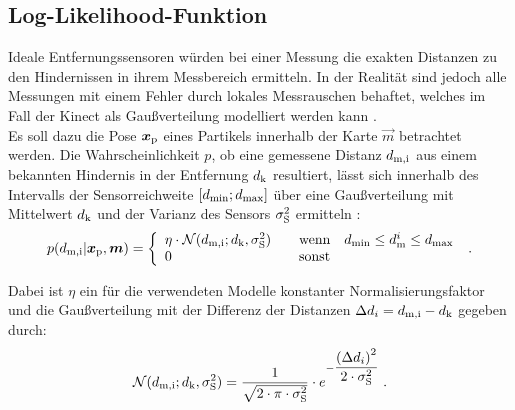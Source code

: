 \subsection{Log-Likelihood-Funktion}
\label{chap.loglik}
Ideale Entfernungssensoren würden bei einer Messung die exakten Distanzen zu den Hindernissen in ihrem Messbereich ermitteln. In der Realität sind jedoch alle Messungen mit einem Fehler durch lokales Messrauschen behaftet, welches im Fall der Kinect als Gaußverteilung modelliert werden kann \cite{Nguyen2012}.\\

Es soll dazu die Pose $\mbox{\boldmath{$x$}}_{{\mathrm{p}}}$ eines Partikels innerhalb der Karte $\vec{m}$ betrachtet werden. Die Wahrscheinlichkeit $p$, ob eine gemessene Distanz $d_{{\mathrm{m,i}}}$ aus einem bekannten Hindernis in der Entfernung $d_{{\mathrm{k}}}$ resultiert, lässt sich innerhalb des Intervalls der Sensorreichweite $[d_{{\mathrm{min}}};d_{{\mathrm{max}}}]$ über eine Gaußverteilung mit Mittelwert $d_{{\mathrm{k}}}$ und der Varianz des Sensors $\sigma_{{\mathrm{S}}}^2$ ermitteln \cite{Thrun2005}:
%
\begin{equation}
p(d_{{\mathrm{m,i}}}|\mbox{\boldmath{$x$}}_{{\mathrm{p}}},\mbox{\boldmath{$m$}}) = \left\lbrace\begin{array}{ll}
\eta  \cdot \mathcal{N}(d_{{\mathrm{m,i}}};d_{{\mathrm{k}}},\sigma_{{\mathrm{S}}}^2) & \quad \text{wenn} \quad d_{{\mathrm{min}}}\leq d_{{\mathrm{m}}}^i \leq d_{{\mathrm{max}}} \\
0 & \quad \text{sonst}
\end{array}
\right. \; \text{.}
\end{equation}


Dabei ist $\eta$ ein für die verwendeten Modelle konstanter Normalisierungsfaktor und die Gaußverteilung mit der Differenz der Distanzen ${\Delta d}_i = d_{{\mathrm{m,i}}}-d_{{\mathrm{k}}}$  gegeben durch:
%
\begin{equation}
\mathcal{N}(d_{{\mathrm{m,i}}};d_{{\mathrm{k}}},\sigma_{{\mathrm{S}}}^2) = \frac{1}{\sqrt{2 \cdot \pi \cdot \sigma_{{\mathrm{S}}}^2}}  \cdot e^{-\dfrac{{({\Delta d}_i)}^2}{2 \cdot \sigma_{{\mathrm{S}}}^2}} \; \text{.}
\end{equation}

